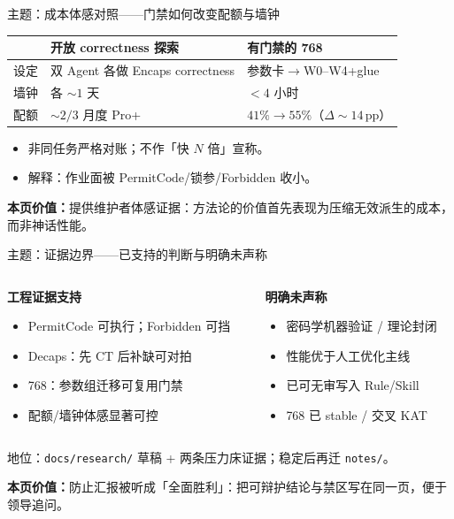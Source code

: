 \documentclass[UTF8,aspectratio=169,11pt]{ctexbeamer}
\newcommand{\pagesummary}[1]{%
  \vfill
  {\footnotesize\noindent\textbf{本页价值：}#1\par}%
}
\begin{document}
\begin{frame}{主题：成本体感对照——门禁如何改变配额与墙钟}
{\footnotesize
\begin{center}
\begin{tabular}{@{}L{2.4cm}L{4.4cm}L{4.6cm}@{}}
  \toprule
  & 开放 correctness 探索 & 有门禁的 768 \\
  \midrule
  设定 & 双 Agent 各做 Encaps correctness & 参数卡$\to$W0--W4+glue \\
  墙钟 & 各 $\sim 1$ 天 & $<4$ 小时 \\
  配额 & $\sim 2/3$ 月度 Pro+ & $41\%\to 55\%$（$\Delta\sim 14$\,pp） \\
  \bottomrule
\end{tabular}
\end{center}
}
\begin{itemize}
  \item 非同任务严格对账；不作「快 $N$ 倍」宣称。
  \item 解释：作业面被 $\mathrm{PermitCode}$/锁参/Forbidden 收小。
\end{itemize}
\pagesummary{提供维护者体感证据：方法论的价值首先表现为压缩无效派生的成本，而非神话性能。}
\end{frame}

\begin{frame}{主题：证据边界——已支持的判断与明确未声称}
\begin{columns}[T]
\begin{column}{0.48\textwidth}
\textbf{工程证据支持}
\begin{itemize}
  \item $\mathrm{PermitCode}$ 可执行；Forbidden 可挡
  \item Decaps：先 $\mathrm{CT}$ 后补缺可对拍
  \item 768：参数组迁移可复用门禁
  \item 配额/墙钟体感显著可控
\end{itemize}
\end{column}
\begin{column}{0.48\textwidth}
\textbf{明确未声称}
\begin{itemize}
  \item 密码学机器验证 / 理论封闭
  \item 性能优于人工优化主线
  \item 已可无审写入 Rule/Skill
  \item 768 已 stable / 交叉 KAT
\end{itemize}
\end{column}
\end{columns}
\vspace{0.35em}
{\footnotesize 地位：\texttt{docs/research/} 草稿 + 两条压力床证据；稳定后再迁 \texttt{notes/}。}
\pagesummary{防止汇报被听成「全面胜利」：把可辩护结论与禁区写在同一页，便于领导追问。}
\end{frame}
\end{document}
